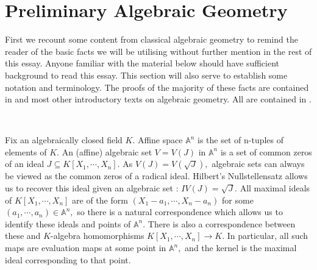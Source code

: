 \documentclass[BSc]{usydthesis}
\numberwithin{equation}{chapter}
\theoremstyle{remark}
\begin{document}
\section{Preliminary Algebraic Geometry}

First we recount some content from classical algebraic geometry to remind the reader of the basic facts we will be utilising without further mention in the rest of this essay. Anyone familiar with the material below should have sufficient background to read this essay. This section will also serve to establish some notation and terminology. The proofs of the majority of these facts are contained in \cite{Fulton:Curves,Reid:Geometry} and most other introductory texts on algebraic geometry. All are contained in \cite{Shafarevich1,Hartshorne,Milne}. 

~

Fix an algebraically closed field $K$. Affine space $\mathbb{A}^n$ is the set of n-tuples of elements of $K.$ An (affine) algebraic set $V=V(J)$ in $\mathbb{A}^n$ is a set of common zeros of an ideal $J\subseteq K[X_1,\cdots, X_n].$ As $V(J) = V(\sqrt{J}),$ algebraic sets can always be viewed as the common zeros of a radical ideal. Hilbert's Nullstellensatz allows us to recover this ideal given an algebraic set : $IV(J) = \sqrt{J}.$ All maximal ideals of $K[X_1,\cdots, X_n]$ are of the form $(X_1-a_1, \cdots, X_n-a_n)$ for some $(a_1,\cdots, a_n) \in \mathbb{A}^n,$ so there is a natural correspondence which allows us to identify these ideals and points of $\mathbb{A}^n.$ There is also a correspondence between these and $K$-algebra homomorphisms $K[X_1,\cdots, X_n]\to K.$ In particular, all such maps are evaluation maps at some point in $\mathbb{A}^n,$ and the kernel is the maximal ideal corresponding to that point. 

~
\end{document}
